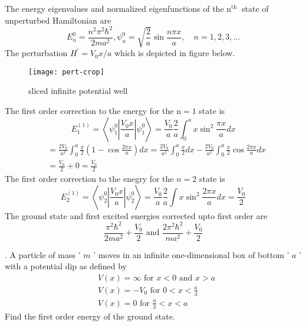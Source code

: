 \begin{answer}
	The energy eigenvalues and normalized eigenfunctions of the $\mathrm{n}^{\text {th }}$ state of unperturbed Hamiltonian are
	$$
	E_{n}^{0}=\frac{n^{2} \pi^{2} \hbar^{2}}{2 m a^{2}}, \psi_{n}^{0}=\sqrt{\frac{2}{a}} \sin \frac{n \pi x}{a}, \quad n=1,2,3, \ldots
	$$
	The perturbation $H^{\prime}=V_{0} x / a$ which is depicted in figure below.\\
	\begin{figure}[H]
		\centering
		\texttt{[image: pert-crop]}
		\caption{sliced infinite potential well}
		\label{}
	\end{figure}
	The first order correction to the energy for the $\mathrm{n}=1$ state is
	$$
	E_{1}^{(1)}=\left\langle\psi_{1}^{0}\left|\frac{V_{0} x}{a}\right| \psi_{1}^{0}\right\rangle=\frac{V_{0}}{a} \frac{2}{a} \int_{0}^{a} x \sin ^{2} \frac{\pi x}{a} d x
	$$
	$$\begin{aligned}
		&=\frac{2 V_{0}}{a^{2}} \int_{0}^{a} \frac{x}{2}\left(1-\cos \frac{2 \pi x}{a}\right) d x=\frac{2 V_{0}}{a^{2}} \int_{0}^{a} \frac{x}{2} d x-\frac{2 V_{0}}{a^{2}} \int_{0}^{a} \frac{x}{2} \cos \frac{2 \pi x}{a} d x \\
		&=\frac{V_{0}}{2}+0=\frac{V_{0}}{2}
	\end{aligned}$$
	The first order correction to the enegry for the $n=2$ state is
	$$
	E_{2}^{(1)}=\left\langle\psi_{2}^{0}\left|\frac{V_{0} x}{a}\right| \psi_{2}^{0}\right\rangle=\frac{V_{0}}{a} \frac{2}{a} \int x \sin ^{2} \frac{2 \pi x}{a} d x=\frac{V_{0}}{2}
	$$
	The ground state and first excited energies corrected upto first order are
	$$
	\frac{\pi^{2} \hbar^{2}}{2 m a^{2}}+\frac{V_{0}}{2} \text { and } \frac{2 \pi^{2} \hbar^{2}}{m a^{2}}+\frac{V_{0}}{2}
	$$
\end{answer}
\begin{exercise}
. A particle of mass ' $m$ ' moves in an infinite one-dimensional box of bottom ' $a$ ' with a potential dip as defined by
	$$
	\begin{aligned}
	&V(x)=\infty \text { for } x<0 \text { and } x>a \\
	&V(x)=-V_{0} \text { for } 0<x<\frac{a}{3} \\
	&V(x)=0 \text { for } \frac{a}{3}<x<a
	\end{aligned}
	$$
	Find the first order energy of the ground state.
\end{exercise}
